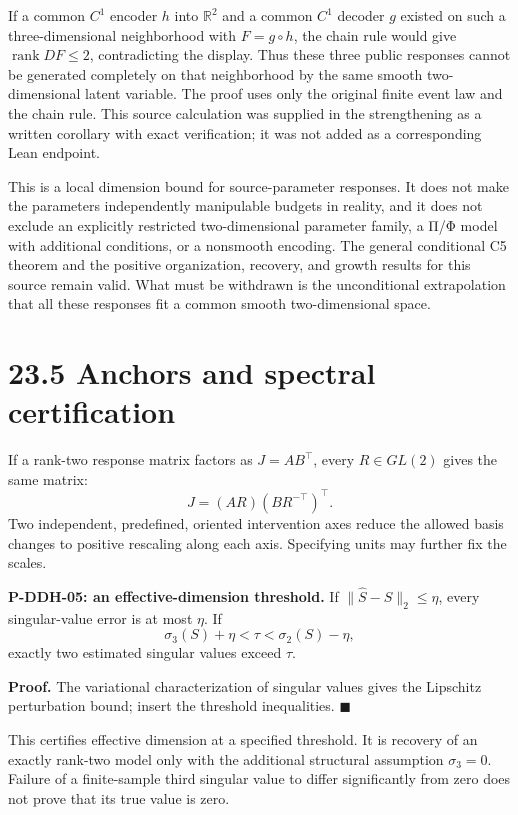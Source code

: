 \documentclass[
  english,
  11pt,
  oneside]{book}
\begin{document}
If a common \(C^1\) encoder \(h\) into \(\mathbb R^2\) and a common \(C^1\) decoder \(g\) existed on such a three-dimensional neighborhood with \(F=g\circ h\), the chain rule would give \(\operatorname{rank}DF\le2\), contradicting the display. Thus these three public responses cannot be generated completely on that neighborhood by the same smooth two-dimensional latent variable. The proof uses only the original finite event law and the chain rule. This source calculation was supplied in the strengthening as a written corollary with exact verification; it was not added as a corresponding Lean endpoint.

This is a local dimension bound for source-parameter responses. It does not make the parameters independently manipulable budgets in reality, and it does not exclude an explicitly restricted two-dimensional parameter family, a Π/Φ model with additional conditions, or a nonsmooth encoding. The general conditional C5 theorem and the positive organization, recovery, and growth results for this source remain valid. What must be withdrawn is the unconditional extrapolation that all these responses fit a common smooth two-dimensional space.

\section{23.5 Anchors and spectral certification}\label{anchors-and-spectral-certification}

If a rank-two response matrix factors as \(J=AB^\top\), every \(R\in GL(2)\) gives the same matrix: \[J=(AR)(BR^{-\top})^\top.\] Two independent, predefined, oriented intervention axes reduce the allowed basis changes to positive rescaling along each axis. Specifying units may further fix the scales.

\hypertarget{p-ddh-05}{}\label{p-ddh-05}

\textbf{P-DDH-05: an effective-dimension threshold.} If \(\|\widehat S-S\|_2\le\eta\), every singular-value error is at most \(\eta\). If \[\sigma_3(S)+\eta<\tau<\sigma_2(S)-\eta,\] exactly two estimated singular values exceed \(\tau\).

\textbf{Proof.} The variational characterization of singular values gives the Lipschitz perturbation bound; insert the threshold inequalities. \(\blacksquare\)

This certifies effective dimension at a specified threshold. It is recovery of an exactly rank-two model only with the additional structural assumption \(\sigma_3=0\). Failure of a finite-sample third singular value to differ significantly from zero does not prove that its true value is zero.
\end{document}
